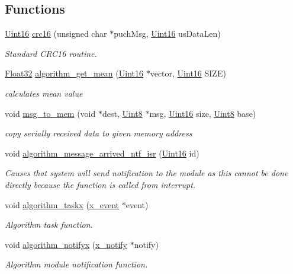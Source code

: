 \subsection*{Functions}
\begin{DoxyCompactItemize}
\item 
\hyperlink{a00072_a59a9f6be4562c327cbfb4f7e8e18f08b}{Uint16} \hyperlink{a00021_a6553827687db2137ee550ad6e1d2f316}{crc16} (unsigned char $\ast$puch\+Msg, \hyperlink{a00072_a59a9f6be4562c327cbfb4f7e8e18f08b}{Uint16} us\+Data\+Len)
\begin{DoxyCompactList}\small\item\em Standard C\+R\+C16 routine. \end{DoxyCompactList}\item 
\hyperlink{a00072_a87d38f886e617ced2698fc55afa07637}{Float32} \hyperlink{a00021_ac02222eba93356b04a6327ffcf82b5cf}{algorithm\+\_\+get\+\_\+mean} (\hyperlink{a00072_a59a9f6be4562c327cbfb4f7e8e18f08b}{Uint16} $\ast$vector, \hyperlink{a00072_a59a9f6be4562c327cbfb4f7e8e18f08b}{Uint16} S\+I\+Z\+E)
\begin{DoxyCompactList}\small\item\em calculates mean value \end{DoxyCompactList}\item 
void \hyperlink{a00021_a126f3d78a95341a19a3e862e57357952}{msg\+\_\+to\+\_\+mem} (void $\ast$dest, \hyperlink{a00072_af84840501dec18061d18a68c162a8fa2}{Uint8} $\ast$msg, \hyperlink{a00072_a59a9f6be4562c327cbfb4f7e8e18f08b}{Uint16} size, \hyperlink{a00072_af84840501dec18061d18a68c162a8fa2}{Uint8} base)
\begin{DoxyCompactList}\small\item\em copy serially received data to given memory address \end{DoxyCompactList}\item 
void \hyperlink{a00021_a85471d58eae93d5d7e7e2b52e2b915d3}{algorithm\+\_\+message\+\_\+arrived\+\_\+ntf\+\_\+isr} (\hyperlink{a00072_a59a9f6be4562c327cbfb4f7e8e18f08b}{Uint16} id)
\begin{DoxyCompactList}\small\item\em Causes that system will send notification to the module as this cannot be done directly because the function is called from interrupt. \end{DoxyCompactList}\item 
void \hyperlink{a00021_a1d182ae18a9176c2a1e28cc654dc0e43}{algorithm\+\_\+taskx} (\hyperlink{a00036_de/d37/a00849}{x\+\_\+event} $\ast$event)
\begin{DoxyCompactList}\small\item\em Algorithm task function. \end{DoxyCompactList}\item 
void \hyperlink{a00021_a93269cdec3e21934aa9395440a2de605}{algorithm\+\_\+notifyx} (\hyperlink{a00036_df/d4c/a00851}{x\+\_\+notify} $\ast$notify)
\begin{DoxyCompactList}\small\item\em Algorithm module notification function. \end{DoxyCompactList}\end{DoxyCompactItemize}

